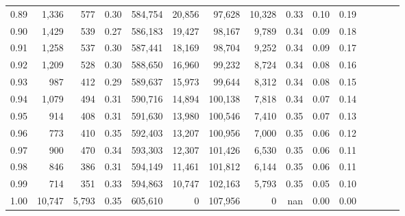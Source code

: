 \begin{tabular}{rrrcrrrrrrrrrrr}
0.89 &   1,336 &    577 &                                       0.30 &  584,754 &   20,856 &   97,628 &   10,328 &  0.33 &  0.10 &                         0.19 \\
0.90 &   1,429 &    539 &                                       0.27 &  586,183 &   19,427 &   98,167 &    9,789 &  0.34 &  0.09 &                         0.18 \\
0.91 &   1,258 &    537 &                                       0.30 &  587,441 &   18,169 &   98,704 &    9,252 &  0.34 &  0.09 &                         0.17 \\
0.92 &   1,209 &    528 &                                       0.30 &  588,650 &   16,960 &   99,232 &    8,724 &  0.34 &  0.08 &                         0.16 \\
0.93 &     987 &    412 &                                       0.29 &  589,637 &   15,973 &   99,644 &    8,312 &  0.34 &  0.08 &                         0.15 \\
0.94 &   1,079 &    494 &                                       0.31 &  590,716 &   14,894 &  100,138 &    7,818 &  0.34 &  0.07 &                         0.14 \\
0.95 &     914 &    408 &                                       0.31 &  591,630 &   13,980 &  100,546 &    7,410 &  0.35 &  0.07 &                         0.13 \\
0.96 &     773 &    410 &                                       0.35 &  592,403 &   13,207 &  100,956 &    7,000 &  0.35 &  0.06 &                         0.12 \\
0.97 &     900 &    470 &                                       0.34 &  593,303 &   12,307 &  101,426 &    6,530 &  0.35 &  0.06 &                         0.11 \\
0.98 &     846 &    386 &                                       0.31 &  594,149 &   11,461 &  101,812 &    6,144 &  0.35 &  0.06 &                         0.11 \\
0.99 &     714 &    351 &                                       0.33 &  594,863 &   10,747 &  102,163 &    5,793 &  0.35 &  0.05 &                         0.10 \\
1.00 &  10,747 &  5,793 &                                       0.35 &  605,610 &        0 &  107,956 &        0 &   nan &  0.00 &                         0.00 \\
\bottomrule
\end{tabular}
